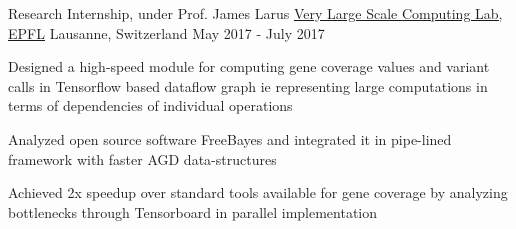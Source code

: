 \begin{cventries}
  \cventry
    {Research Internship, under Prof. James Larus } %
    {\href {https://vlsc.epfl.ch/} {Very Large Scale Computing Lab, EPFL}} %
    {Lausanne, Switzerland} %
    {May 2017 - July 2017} %
    {
      \begin{cvitems} %
        \item {Designed a high-speed module for computing gene coverage values and variant calls in Tensorflow based dataflow graph ie representing large computations in terms of dependencies of individual operations}
        \item {Analyzed open source software FreeBayes and integrated it in pipe-lined framework with faster AGD data-structures}
        \item {Achieved 2x speedup over standard tools available for gene coverage by analyzing bottlenecks through Tensorboard in parallel implementation}
      \end{cvitems}
    }

\end{cventries}
